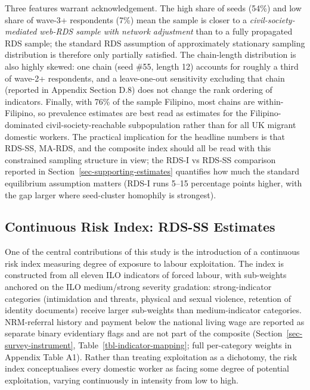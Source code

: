 \documentclass[
  12pt,
  letterpaper,
  DIV=11,
  numbers=noendperiod]{scrartcl}
\begin{document}
Three features warrant acknowledgement. The high share of seeds (54\%)
and low share of wave-3+ respondents (7\%) mean the sample is closer to
a \emph{civil-society-mediated web-RDS sample with network adjustment}
than to a fully propagated RDS sample; the standard RDS assumption of
approximately stationary sampling distribution is therefore only
partially satisfied. The chain-length distribution is also highly
skewed: one chain (seed \#55, length 12) accounts for roughly a third of
wave-2+ respondents, and a leave-one-out sensitivity excluding that
chain (reported in Appendix Section D.8) does not change the rank
ordering of indicators. Finally, with 76\% of the sample Filipino, most
chains are within-Filipino, so prevalence estimates are best read as
estimates for the Filipino-dominated civil-society-reachable
subpopulation rather than for all UK migrant domestic workers. The
practical implication for the headline numbers is that RDS-SS, MA-RDS,
and the composite index should all be read with this constrained
sampling structure in view; the RDS-I vs RDS-SS comparison reported in
Section~\ref{sec-supporting-estimates} quantifies how much the standard
equilibrium assumption matters (RDS-I runs 5--15 percentage points
higher, with the gap larger where seed-cluster homophily is strongest).

\subsection{Continuous Risk Index: RDS-SS
Estimates}\label{sec-composite-results}

One of the central contributions of this study is the introduction of a
continuous risk index measuring degree of exposure to labour
exploitation. The index is constructed from all eleven ILO indicators of
forced labour, with sub-weights anchored on the ILO medium/strong
severity gradation: strong-indicator categories (intimidation and
threats, physical and sexual violence, retention of identity documents)
receive larger sub-weights than medium-indicator categories.
NRM-referral history and payment below the national living wage are
reported as separate binary evidentiary flags and are not part of the
composite (Section~\ref{sec-survey-instrument},
Table~\ref{tbl-indicator-mapping}; full per-category weights in Appendix
Table A1). Rather than treating exploitation as a dichotomy, the risk
index conceptualises every domestic worker as facing some degree of
potential exploitation, varying continuously in intensity from low to
high.
\end{document}
